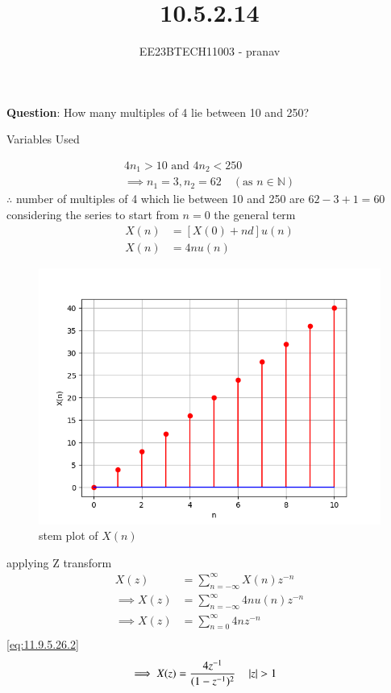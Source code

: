 \documentclass[journal,12pt,twocolumn]{IEEEtran}
\theoremstyle{remark}
\begin{document}

\vspace{3cm}

\title{10.5.2.14}
\author{EE23BTECH11003 - pranav}
\maketitle
\newpage

\bigskip
\renewcommand{\thefigure}{\arabic{figure}}
\renewcommand{\thetable}{\arabic{table}}

\textbf{Question}:
How many multiples of 4 lie between 10 and 250?\\
\solution
\begin{table}[h]
    \centering
    
    \caption{Variables Used}
    \label{tab:table_11.9.3.6}
\end{table}
\begin{align}
     4n_{1}>10   \text{ and }  4n_{2}<250  \\
\implies n_{1}=3,n_{2}=62  \quad (\text{as }  n \in \mathbb{N})
\end{align}
 $\therefore$ number of multiples of 4 which lie between  10 and 250 are $62-3+1=60$ \\
considering the series to start from $n=0$ the general term
\begin{align}
X(n)&=[X(0)+nd]u(n)\\
X(n)&=4nu(n)
\end{align}
\begin{figure}[h!]
    \centering
    \includegraphics[width=1.1\linewidth]{figs/graph1.png}
    \caption{stem plot of $X(n)$}
\end{figure}

applying Z transform
\begin{align}
    X(z)&= \sum_{n=-\infty}^{\infty}X(n) z^{-n}\\
   \implies X(z)&= \sum_{n=-\infty}^{\infty} 4n u(n) z^{-n}\\
   \implies X(z) &=\sum_{n= 0}^{\infty} 4n  z^{-n}\\
   \end{align}
    \ref{eq:11.9.5.26.2}\\
   \begin{align}
   \implies X(z)&=\frac{4 z^{-1}}{(1-z^{-1})^{2}}\quad \left\vert z\right\vert>1
\end{align}
\end{document}
